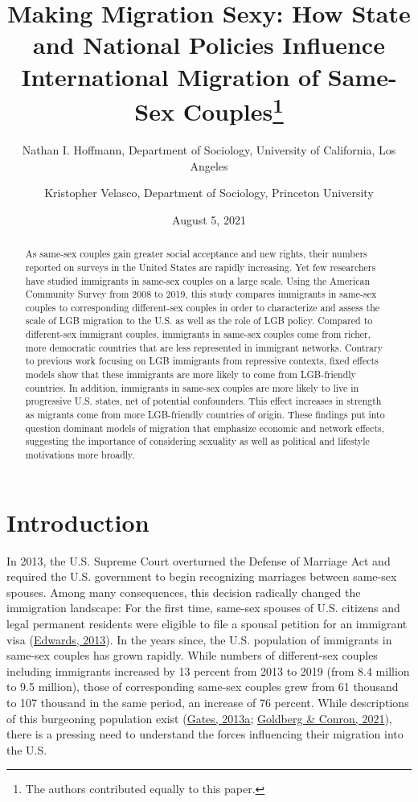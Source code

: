 \documentclass[
  11pt,
]{article}
\title{Making Migration Sexy: How State and National Policies Influence International Migration of Same-Sex Couples\thanks{The authors contributed equally to this paper.}}
\author{Nathan I. Hoffmann, Department of Sociology, University of California, Los Angeles \and Kristopher Velasco, Department of Sociology, Princeton University}
\date{August 5, 2021}
\begin{document}
\maketitle
\begin{abstract}
As same-sex couples gain greater social acceptance and new rights, their numbers reported on surveys in the United States are rapidly increasing. Yet few researchers have studied immigrants in same-sex couples on a large scale. Using the American Community Survey from 2008 to 2019, this study compares immigrants in same-sex couples to corresponding different-sex couples in order to characterize and assess the scale of LGB migration to the U.S. as well as the role of LGB policy. Compared to different-sex immigrant couples, immigrants in same-sex couples come from richer, more democratic countries that are less represented in immigrant networks. Contrary to previous work focusing on LGB immigrants from repressive contexts, fixed effects models show that these immigrants are more likely to come from LGB-friendly countries. In addition, immigrants in same-sex couples are more likely to live in progressive U.S. states, net of potential confounders. This effect increases in strength as migrants come from more LGB-friendly countries of origin. These findings put into question dominant models of migration that emphasize economic and network effects, suggesting the importance of considering sexuality as well as political and lifestyle motivations more broadly.
\end{abstract}

\hypertarget{introduction}{%
\section{Introduction}\label{introduction}}

In 2013, the U.S. Supreme Court overturned the Defense of Marriage Act and required the U.S. government to begin recognizing marriages between same-sex spouses. Among many consequences, this decision radically changed the immigration landscape: For the first time, same-sex spouses of U.S. citizens and legal permanent residents were eligible to file a spousal petition for an immigrant visa (\protect\hyperlink{ref-edwards_2013}{Edwards, 2013}). In the years since, the U.S. population of immigrants in same-sex couples has grown rapidly. While numbers of different-sex couples including immigrants increased by 13 percent from 2013 to 2019 (from 8.4 million to 9.5 million), those of corresponding same-sex couples grew from 61 thousand to 107 thousand in the same period, an increase of 76 percent. While descriptions of this burgeoning population exist (\protect\hyperlink{ref-gates_2013}{Gates, 2013a}; \protect\hyperlink{ref-goldberg_2021}{Goldberg \& Conron, 2021}), there is a pressing need to understand the forces influencing their migration into the U.S.
\end{document}
